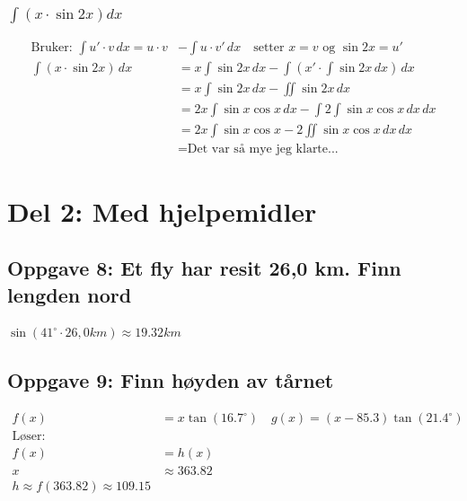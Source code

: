 \documentclass{article}
\begin{document}
\subsubsection{$\int (x \cdot \sin 2x)dx$}

\begin{align*}
    \text{Bruker: } \int u' \cdot v \, dx = u \cdot v &- \int u \cdot v' \, dx \quad \text{setter $x=v$ og $\sin 2x = u'$} \\
    \int (x \cdot \sin 2x) \, dx &= x \int \sin 2x \, dx - \int (x' \cdot \int \sin 2x \, dx) \, dx\\
    &= x \int \sin 2x \, dx - \iint \sin 2x \, dx\\
    &= 2x \int \sin x \cos x \, dx - \int 2 \int \sin x \cos x \, dx \, dx \\
    &= 2x \int \sin x \cos x - 2 \iint \sin x \cos x \, dx \, dx \\
    &= \text{Det var så mye jeg klarte...}
\end{align*}

\section{Del 2: Med hjelpemidler}

\subsection{Oppgave 8: Et fly har resit 26,0 km. Finn lengden nord}

$\sin(41^{\circ} \cdot 26,0km) \approx 19.32 km$


\subsection{Oppgave 9: Finn høyden av tårnet}


\begin{align*}
    f(x) &= x\tan(16.7^\circ) \quad g(x)=(x-85.3)\tan(21.4^\circ) \\
    \text{Løser:} \\
    f(x) &= h(x) \\
    x &\approx 363.82 \\
    h \approx f(363.82) \approx 109.15 
\end{align*}
\end{document}
